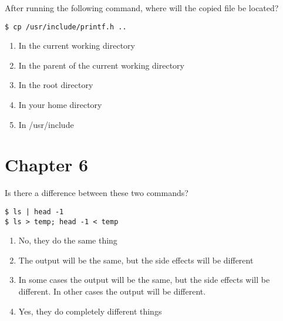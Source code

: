 \documentclass{beamer}
\begin{document}
\begin{frame}[fragile]

After running the following command, where will the copied file be located?

\begin{verbatim}
$ cp /usr/include/printf.h ..
\end{verbatim}

\begin{enumerate}[label=\Alph*)]

\item In the current working directory

\item In the parent of the current working directory

\item In the root directory

\item In your home directory

\item In /usr/include

\end{enumerate}

\end{frame}


\section{Chapter 6}

\begin{frame}[fragile]

Is there a difference between these two commands?

\begin{verbatim}
$ ls | head -1
$ ls > temp; head -1 < temp 
\end{verbatim}

\begin{enumerate}[label=\Alph*)]

\item No, they do the same thing

\item The output will be the same, but the side effects will be different

\item In some cases the output will be the same, but the side effects will be different. In other cases the output will be different.

\item Yes, they do completely different things

\end{enumerate}

\end{frame}
\end{document}
